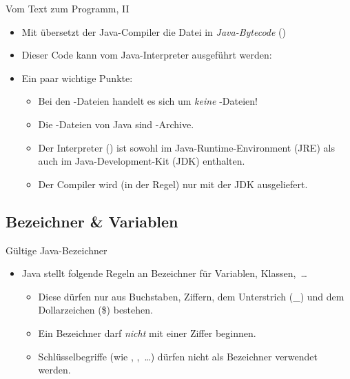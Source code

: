 \begin{frame}{Vom Text zum Programm, II}
    \begin{itemize}[<+(1)->]
        \widei
        \item Mit  übersetzt der Java-Compiler die Datei in \emph{Java-Bytecode}\pause{} ()
        \item Dieser Code kann vom Java-Interpreter ausgeführt werden:\pause{} 
        \item Ein paar wichtige Punkte: \begin{itemize}
            \widei
            \item Bei den -Dateien handelt es sich um \emph{keine} -Dateien!
            \item Die -Dateien von Java sind -Archive.
            \item Der Interpreter () ist sowohl im Java-Runtime-Environment (JRE) als auch im Java-Development-Kit (JDK) enthalten.
            \item Der Compiler wird (in der Regel) nur mit der JDK ausgeliefert.
        \end{itemize}
    \end{itemize}
\end{frame}

\subsection{Bezeichner \& Variablen}

\begin{frame}{Gültige Java-Bezeichner}
    \begin{itemize}[<+(1)->]
        \widei
        \item Java stellt folgende Regeln an Bezeichner für Variablen, Klassen,~\ldots \begin{itemize}
            \widei
            \item Diese dürfen nur aus Buchstaben, Ziffern, dem Unterstrich (\_) und dem Dollarzeichen (\$) bestehen.
            \item Ein Bezeichner darf \emph{nicht} mit einer Ziffer beginnen.
            \item Schlüsselbegriffe (wie , ,~\ldots) dürfen nicht als Bezeichner verwendet werden.
        \end{itemize}
    \end{itemize}
\end{frame}

